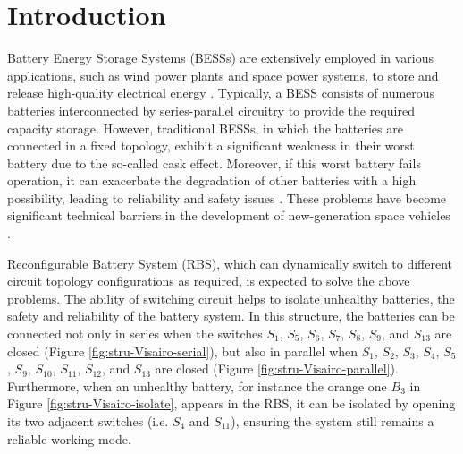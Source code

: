 \documentclass{article}
\begin{document}

\section{Introduction}

Battery Energy Storage Systems (BESSs) are extensively employed in various applications, such as wind power plants and space power systems, to store and release high-quality electrical energy \cite{desiqueiraControlStrategySmooth2021,yangBatteryEnergyStorage2018,choCommercialResearchBattery2015,zhangDevelopmentProspectChinese2021,schwanbeckInternationalSpaceStation2019}.
Typically, a BESS consists of numerous batteries interconnected by series-parallel circuitry to provide the required capacity storage.
However, traditional BESSs, in which the batteries are connected in a fixed topology, exhibit a significant weakness in their worst battery due to the so-called cask effect.
Moreover, if this worst battery fails  operation, it can exacerbate the degradation of other batteries with a high possibility, leading to reliability and safety issues \cite{yangUnbalancedDischargingAging2016,fengPropagationMechanismsDiagnosis2019,jeevarajanBatterySafetyQualifications2012}.
These problems have become significant technical barriers in the development of new-generation space vehicles  \cite{pomboHybridPowerSystem2021}.


Reconfigurable Battery System (RBS), which can dynamically switch to different circuit topology configurations as required, is expected to solve the above problems\cite{hanNextGenerationBatteryManagement2020a}.
The ability of switching circuit helps to isolate unhealthy batteries,  the safety and reliability of the battery system.
In this structure, the batteries can be connected not only in series when the switches $S_1$, $S_5$, $S_6$, $S_7$, $S_8$, $S_9$, and $S_{13}$ are closed (Figure \ref{fig:stru-Visairo-serial}), but also in parallel when $S_1$, $S_2$, $S_3$, $S_4$, $S_5$, $S_9$, $S_{10}$, $S_{11}$, $S_{12}$, and $S_{13}$ are closed (Figure \ref{fig:stru-Visairo-parallel}).
Furthermore, when an unhealthy battery, for instance the orange one $B_3$ in Figure \ref{fig:stru-Visairo-isolate}, appears in the RBS, it can be isolated by opening its two adjacent switches (i.e. $S_4$ and $S_{11}$), ensuring the system still remains a reliable working mode.
\end{document}
